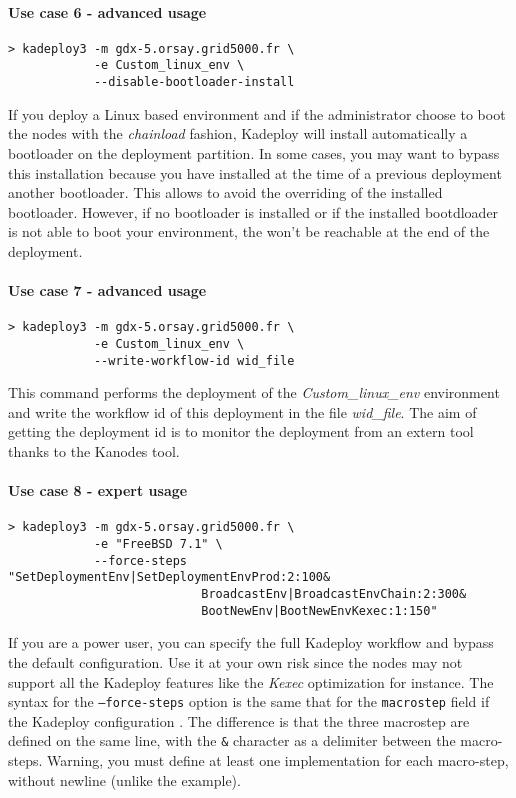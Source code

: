 \documentclass[a4wide,10pt,oneside]{book}
\begin{document}
\paragraph{Use case 6 - advanced usage}
\begin{verbatim}
> kadeploy3 -m gdx-5.orsay.grid5000.fr \
            -e Custom_linux_env \
            --disable-bootloader-install
\end{verbatim}
If you deploy a Linux based environment and if the administrator choose to boot the nodes with the \textit{chainload} fashion, Kadeploy will install automatically a bootloader on the deployment partition. In some cases, you may want to bypass this installation because you have installed at the time of a previous deployment another bootloader. This allows to avoid the overriding of the installed bootloader. However, if no bootloader is installed or if the installed bootdloader is not able to boot your environment, the won't be reachable at the end of the deployment.

\paragraph{Use case 7 - advanced usage}\label{par:usecase-wid}
\begin{verbatim}
> kadeploy3 -m gdx-5.orsay.grid5000.fr \
            -e Custom_linux_env \
            --write-workflow-id wid_file
\end{verbatim}
This command performs the deployment of the \textit{Custom\_linux\_env} environment and write the workflow id of this deployment in the file \textit{wid\_file}. The aim of getting the deployment id is to monitor the deployment from an extern tool thanks to the Kanodes tool.

\paragraph{Use case 8 - expert usage}
\begin{verbatim}
> kadeploy3 -m gdx-5.orsay.grid5000.fr \
            -e "FreeBSD 7.1" \
            --force-steps "SetDeploymentEnv|SetDeploymentEnvProd:2:100&
                           BroadcastEnv|BroadcastEnvChain:2:300&
                           BootNewEnv|BootNewEnvKexec:1:150"
\end{verbatim}
If you are a power user, you can specify the full Kadeploy workflow and bypass the default configuration. Use it at your own risk since the nodes may not support all the Kadeploy features like the \textit{Kexec} optimization for instance. The syntax for the \texttt{--force-steps} option is the same that for the \texttt{macrostep} field if the Kadeploy configuration%
. The difference is that the three macrostep are defined on the same line, with the \texttt{\&} character as a delimiter between the macro-steps. Warning, you must define at least one implementation for each macro-step, without newline (unlike the example).
\end{document}
